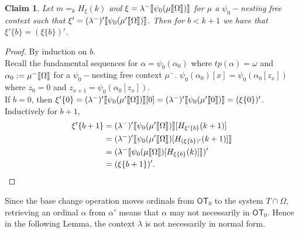 \documentclass{amsart}
\theoremstyle{plain}
\theoremstyle{plain}
\newtheorem{claim}[theorem]{Claim}
\def\scbrl{[\hspace{-.14em}[}
\def\scbrr{]\hspace{-.14em}]}
\def\scbr#1{\scbrl#1\scbrr}
\newcommand\OT{\mathsf{OT}}
\newcommand{\Om}{{\Omega}}
\newcommand{\al}{{\alpha}}
\newcommand{\la}{\lambda}
\newcommand{\om}{\omega}
\def\scbrl{[\hspace{-.14em}[}
\def\scbrr{]\hspace{-.14em}]}
\def\scbr#1{\scbrl#1\scbrr}
\begin{document}
\smallskip

\begin{claim}\label{claim2}
Let $m =_k H_\xi(k)$ and $\xi = \la^-\scbr{\psi_0(\mu\scbr{\Om})}$ for $\mu$ a $\psi_0-$nesting free context such that $\xi' = (\la^-)'\scbr{\psi_0(\mu'\scbr{\Om})}$. Then for $b<k+1$ we have that ${\xi}'\{b\} = (\xi\{b\})'$.
\end{claim}
\begin{proof}			
By induction on $b$.\\
Recall the fundamental sequences for $\al = \psi_0(\al_0)$ where $tp(\al)=\om$ and $\al_0 :=\mu^-\scbr{\Om}$ for a $\psi_0-$nesting free context $\mu^-$.
$\psi_0(\al_0)[x] = \psi_0(\al_0[z_x])$ where $z_0=0$ and $z_{x+1}= \psi_0(\al_0[z_x])$.\\
If $b=0$, then ${\xi}'\{0\} = (\la^-)'\scbr{\psi_0(\mu'\scbr{\Om})}[0]=  (\la^-)'\scbr{\psi_0(\mu'\scbr{0})}= (\xi\{0\})'$.\\
Inductively for $b+1$, 
\begin{align*}
    {\xi'\{b+1\}} &=(\la^-)'\scbr{\psi_0(\mu'\scbr{\Om})}[H_{\xi'\{b\}}(k+1)] \\ 
    &=( \la^-)'\scbr{\psi_0(\mu'\scbr{\Om})[H_{(\xi\{b\})'}(k+1)] }\\
    &=( \la^-\scbr{\psi_0(\mu\scbr{\Om} )[{H_{\xi\{b\}}(k) }]})' \\
    &=(\xi\{b+1\})'.
\end{align*}
\end{proof}		

Since the base change operation moves ordinals from $\OT_0$ to the system $T\cap \Om$, retrieving an ordinal $\al$ from $\al'$ means that $\al$ may not necessarily in $\OT_0$. Hence in the following Lemma, the context $\la$ is not necessarily in normal form.
\smallskip
\end{document}
